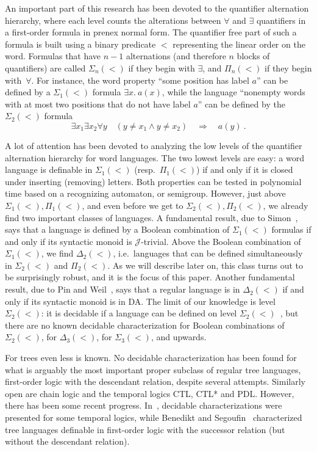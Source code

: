 \documentclass{LMCS}
\begin{document}
An important part of this research has been devoted to the quantifier
alternation hierarchy, where each level counts the alterations between
$\forall$ and $\exists$ quantifiers in a first-order formula in prenex normal
form. The quantifier free part of such a formula is  built using a binary
predicate $<$ representing the linear order on the word. Formulas that have
$n-1$ alternations (and therefore $n$ blocks of quantifiers) are called $\Sigma_n(<)$ if they begin with $\exists$, and
$\Pi_n(<)$ if they begin with~$\forall$. For instance, the word property ``some
position has label $a$'' can be defined by a $\Sigma_1(<)$ formula $\exists x.\
a(x)$, while the language ``nonempty words with at most two positions that
do not have label $a$'' can be defined by the $\Sigma_2(<)$ formula
\[
  \exists x_1 \exists x_2  \forall y \quad (y \neq x_1 \land y \neq
  x_2) \quad 
  \Rightarrow \quad a(y)\ .
\]


A lot of attention has been devoted to analyzing the low levels of the
quantifier alternation hierarchy for word languages.  The two lowest levels are easy: a word
language is definable in $\Sigma_1(<)$ (resp.~$\Pi_1(<)$) if and only if it is
closed under inserting (removing) letters. Both properties can be tested in
polynomial time based on a recognizing automaton, or semigroup.  However, just
above $\Sigma_1(<),\Pi_1(<)$, and even before we get to $\Sigma_2(<),
\Pi_2(<)$, we already find two important classes of languages.  A fundamental
result, due to Simon~\cite{simonpiecewise}, says that a language is defined by
a Boolean combination of $\Sigma_1(<)$ formulas if and only if its syntactic
monoid is $\mathcal J$-trivial. Above the Boolean combination of $\Sigma_1(<)$,
we find $\Delta_2(<)$, i.e.~languages that can be defined simultaneously in
$\Sigma_2(<)$ and $\Pi_2(<)$. As we will describe later on, this class turns
out to be surprisingly robust, and it is the focus of this paper. Another
fundamental result, due to Pin and Weil~\cite{weilpinpoly}, says that a regular
language is in $\Delta_2(<)$ if and only if its syntactic monoid is in {\sc
  DA}.  The limit of our knowledge is level $\Sigma_2(<)$: it is decidable if a
language can be defined on level $\Sigma_2(<)$~\cite{arfi91,weilpinpoly}, but
there are no known decidable characterization for Boolean combinations of
$\Sigma_2(<)$, for $\Delta_3(<)$, for $\Sigma_3(<)$, and upwards.


For trees even less is known.  No decidable characterization has been
found for what is arguably the most important proper subclass of
regular tree languages, first-order logic with the descendant
relation, despite several attempts.  Similarly open are chain logic
and the temporal logics CTL, CTL* and PDL.  However, there has been
some recent progress.  In~\cite{efextcs}, decidable characterizations
were presented for some temporal logics, while Benedikt and
Segoufin~\cite{segoufinfo} characterized tree languages definable in
first-order logic with the successor relation (but without the
descendant relation).
\end{document}
